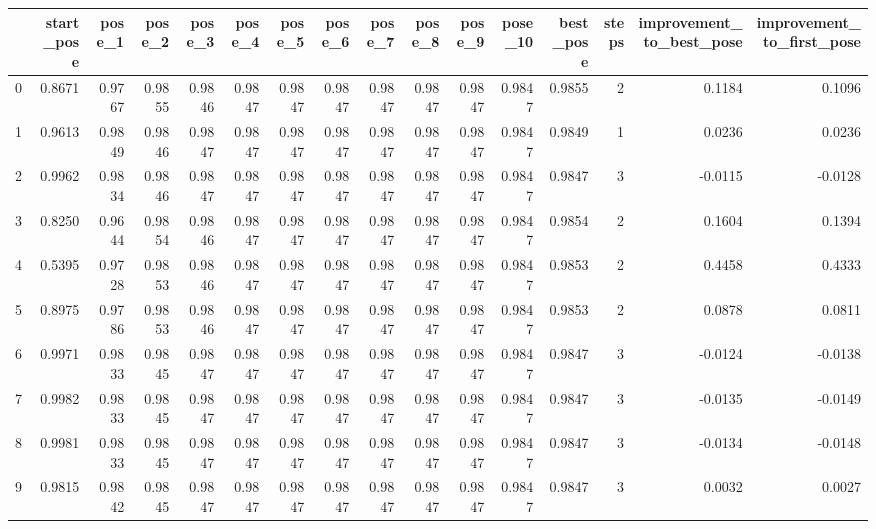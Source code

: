 \begin{tabular}{lrrrrrrrrrrrrrrr}
\toprule
{} &  start\_pose &  pose\_1 &  pose\_2 &  pose\_3 &  pose\_4 &  pose\_5 &  pose\_6 &  pose\_7 &  pose\_8 &  pose\_9 &  pose\_10 &  best\_pose &  steps &  improvement\_to\_best\_pose &  improvement\_to\_first\_pose \\
\midrule
0 &      0.8671 &  0.9767 &  0.9855 &  0.9846 &  0.9847 &  0.9847 &  0.9847 &  0.9847 &  0.9847 &  0.9847 &   0.9847 &     0.9855 &      2 &                    0.1184 &                     0.1096 \\
1 &      0.9613 &  0.9849 &  0.9846 &  0.9847 &  0.9847 &  0.9847 &  0.9847 &  0.9847 &  0.9847 &  0.9847 &   0.9847 &     0.9849 &      1 &                    0.0236 &                     0.0236 \\
2 &      0.9962 &  0.9834 &  0.9846 &  0.9847 &  0.9847 &  0.9847 &  0.9847 &  0.9847 &  0.9847 &  0.9847 &   0.9847 &     0.9847 &      3 &                   -0.0115 &                    -0.0128 \\
3 &      0.8250 &  0.9644 &  0.9854 &  0.9846 &  0.9847 &  0.9847 &  0.9847 &  0.9847 &  0.9847 &  0.9847 &   0.9847 &     0.9854 &      2 &                    0.1604 &                     0.1394 \\
4 &      0.5395 &  0.9728 &  0.9853 &  0.9846 &  0.9847 &  0.9847 &  0.9847 &  0.9847 &  0.9847 &  0.9847 &   0.9847 &     0.9853 &      2 &                    0.4458 &                     0.4333 \\
5 &      0.8975 &  0.9786 &  0.9853 &  0.9846 &  0.9847 &  0.9847 &  0.9847 &  0.9847 &  0.9847 &  0.9847 &   0.9847 &     0.9853 &      2 &                    0.0878 &                     0.0811 \\
6 &      0.9971 &  0.9833 &  0.9845 &  0.9847 &  0.9847 &  0.9847 &  0.9847 &  0.9847 &  0.9847 &  0.9847 &   0.9847 &     0.9847 &      3 &                   -0.0124 &                    -0.0138 \\
7 &      0.9982 &  0.9833 &  0.9845 &  0.9847 &  0.9847 &  0.9847 &  0.9847 &  0.9847 &  0.9847 &  0.9847 &   0.9847 &     0.9847 &      3 &                   -0.0135 &                    -0.0149 \\
8 &      0.9981 &  0.9833 &  0.9845 &  0.9847 &  0.9847 &  0.9847 &  0.9847 &  0.9847 &  0.9847 &  0.9847 &   0.9847 &     0.9847 &      3 &                   -0.0134 &                    -0.0148 \\
9 &      0.9815 &  0.9842 &  0.9845 &  0.9847 &  0.9847 &  0.9847 &  0.9847 &  0.9847 &  0.9847 &  0.9847 &   0.9847 &     0.9847 &      3 &                    0.0032 &                     0.0027 \\
\bottomrule
\end{tabular}
